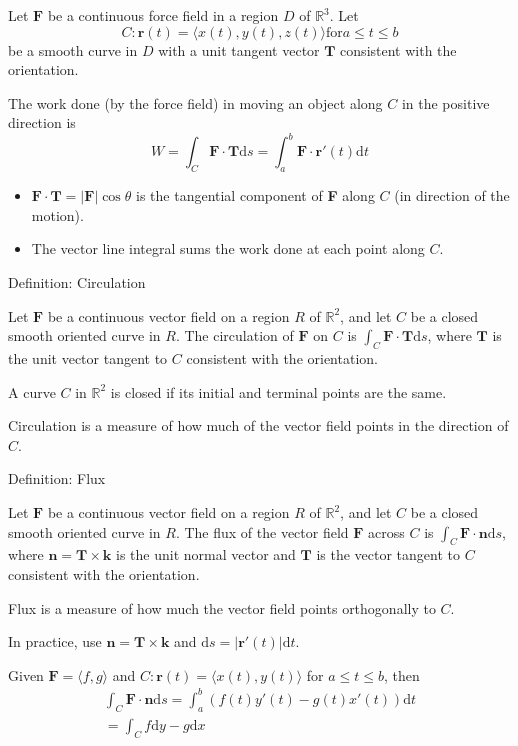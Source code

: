 \documentclass[../calc3.tex]{subfiles}
\begin{document}
\begin{definition}
    Let $\textbf{F}$ be a continuous force field in a region $D$ of $\mathbb{R}^3$. Let 
    \[C:\textbf{r}(t)=\langle x(t),y(t),z(t)\rangle \text{for} a\leq t \leq b\]
    be a smooth curve in $D$ with a unit tangent vector $\textbf{T}$ consistent with the orientation.

    The work done (by the force field) in moving an object along $C$ in the positive direction is 
    \[W = \int_C \textbf{F}\cdot \textbf{T}\mathrm{d}s = \int_a^b \textbf{F}\cdot \textbf{r}'(t)\mathrm{d}t\]
    \begin{itemize}
        \item $\textbf{F}\cdot\textbf{T} = |\textbf{F}|\cos\theta$ is the tangential component of \textbf{F} along $C$ (in direction of the motion).
        \item The vector line integral sums the work done at each point along $C$.
    \end{itemize}
\end{definition}

\begin{definition}
    Definition: Circulation

    Let $\textbf{F}$ be a continuous vector field on a region $R$ of $\mathbb{R}^2$, and let $C$ be a closed 
    smooth oriented curve in $R$. The circulation of $\textbf{F}$ on $C$ is $\int_C \textbf{F}\cdot\textbf{T}\mathrm{d}s$, where 
    $\textbf{T}$ is the unit vector tangent to $C$ consistent with the orientation.

    A curve $C$ in $\mathbb{R}^2$ is closed if its initial and terminal points are the same.

    Circulation is a measure of how much of the vector field points in the direction of $C$.
\end{definition}

\begin{definition}
    Definition: Flux 

    Let $\textbf{F}$ be a continuous vector field on a region $R$ of $\mathbb{R}^2$, and let $C$ be a closed smooth oriented curve in $R$.
    The flux of the vector field $\textbf{F}$ across $C$ is $\int_C \textbf{F}\cdot\textbf{n}\mathrm{d}s$, where $\textbf{n}=\textbf{T}\times\textbf{k}$ is the 
    unit normal vector and $\textbf{T}$ is the vector tangent to $C$ consistent with the orientation.

    Flux is a measure of how much the vector field points orthogonally to $C$.

    In practice, use $\textbf{n}=\textbf{T}\times\textbf{k}$ and $\mathrm{d}s=|\textbf{r}'(t)|\mathrm{d}t$.

    Given $\textbf{F}=\langle f,g\rangle$ and $C:\textbf{r}(t)=\langle x(t), y(t)\rangle$ for $a\leq t\leq b$, then 
    \begin{align*}
        \int_C \textbf{F}\cdot\textbf{n}\mathrm{d}s=\int_a^b (f(t)y'(t)-g(t)x'(t))\mathrm{d}t\\
        =\int_C f\mathrm{d}y-g\mathrm{d}x
    \end{align*}
\end{definition}
\end{document}
